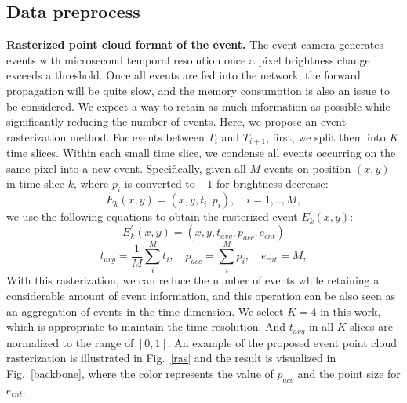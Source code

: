 \documentclass[10pt,twocolumn,letterpaper]{article}
\begin{document}
\subsection{Data preprocess}

\noindent\textbf{Rasterized point cloud format of the event.}
The event camera generates events with microsecond temporal resolution once a pixel brightness change exceeds a threshold.
Once all events are fed into the network, the forward propagation will be quite slow, and the memory consumption is also an issue to be considered.
We expect a way to retain as much information as possible while significantly reducing the number of events.
Here, we propose an event rasterization method. For events between $T_i$ and $T_{i+1}$, first, we split them into $K$ time slices.
Within each small time slice, we condense all events occurring on the same pixel into a new event.
Specifically, given all $M$ events on position $(x, y)$ in time slice $k$, where $p_{i}$ is converted to ${-}1$ for brightness decrease: 
\begin{equation}
E_k(x, y)=(x, y, t_i, p_i),\quad i=1,.., M,
\end{equation}
we use the following equations to obtain the rasterized event $E^\prime_k(x,y)$:
\begin{equation}
E^\prime_k(x,y)=(x, y, t_{avg}, p_{acc}, e_{cnt})
\end{equation}
\begin{equation}
t_{avg} = \frac{1}{M}\sum_i^Mt_i,\quad p_{acc} = \sum_i^Mp_i,\quad e_{cnt}=M,
\end{equation}
With this rasterization, we can reduce the number of events while retaining a considerable amount of event information, and this operation can be also seen as an aggregation of events in the time dimension.
We select $K{=}4$ in this work, which is appropriate to maintain the time resolution. And $t_{avg}$ in all $K$ slices are normalized to the range of $[0, 1]$. An example of the proposed event point cloud rasterization is illustrated in Fig.~\ref{ras} and the result is visualized in Fig.~\ref{backbone}, where the color represents the value of $p_{acc}$ and the point size for $e_{cnt}$.
\end{document}

